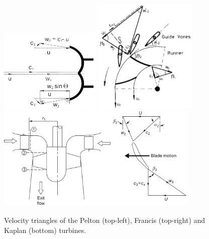 \begin{figure}[ht!]
	\centering
		\includegraphics[height=4cm]{HydroAndWindPower/Figures/Velocity_Triangle_Pelton_Turbine.jpg}
		\includegraphics[height=5.5cm]{HydroAndWindPower/Figures/Velocity_Triangle_Francis_Turbine.png}
		\includegraphics[height=5cm]{HydroAndWindPower/Figures/Velocity_Triangle_Kaplan_Turbine.jpg}
	\caption{Velocity triangles of the Pelton (top-left), Francis (top-right) and Kaplan (bottom) turbines.}
	\label{Fig:velocity_triangles_water_turbines}
\end{figure}

